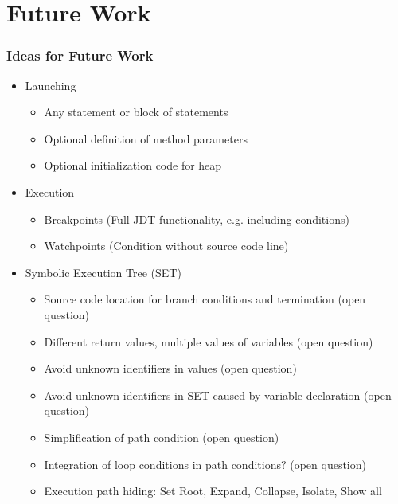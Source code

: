 \documentclass[accentcolor=tud9d,colorbacktitle,inverttitle,landscape,english,presentation,t]{tudbeamer}
\begin{document}
\section{Future Work}
   \begin{frame}[t]
		\frametitle{Ideas for Future Work}
      
      \begin{itemize}
         \item Launching
               \begin{itemize}
                  \item Any statement or block of statements
                  \item Optional definition of method parameters
                  \item Optional initialization code for heap
               \end{itemize}
         \item Execution
               \begin{itemize}
                  \item Breakpoints (Full JDT functionality, e.g. including conditions)
                  \item Watchpoints (Condition without source code line)
               \end{itemize}
         \item Symbolic Execution Tree (SET)
               \begin{itemize}
                  \item Source code location for branch conditions and termination (open question)
                  \item Different return values, multiple values of variables (open question)
                  \item Avoid unknown identifiers in values (open question)
                  \item Avoid unknown identifiers in SET caused by variable declaration (open question)
                  \item Simplification of path condition (open question)
                  \item Integration of loop conditions in path conditions? (open question)
                  \item Execution path hiding: Set Root, Expand, Collapse, Isolate, Show all
               \end{itemize}
      \end{itemize}
	\end{frame}
   
\end{document}
